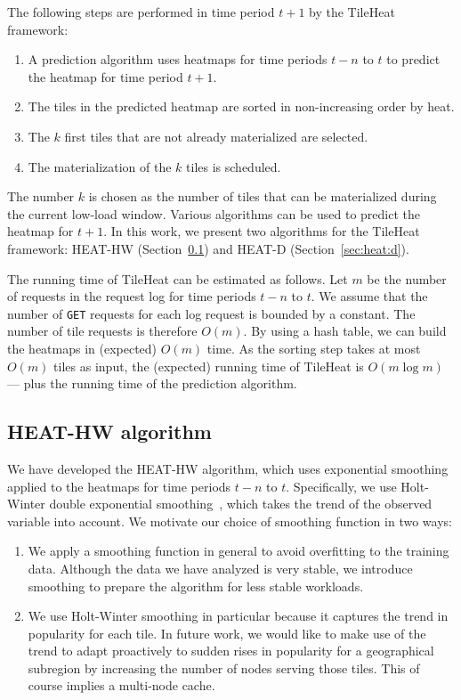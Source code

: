 \documentclass[11pt, oneside]{report}
\begin{document}
{The following steps are performed in time period $t+1$ by the TileHeat framework:
%
\begin{enumerate}
\item A prediction algorithm uses heatmaps for time periods $t-n$ to $t$ to predict the heatmap for time period $t+1$.
\item The tiles in the predicted heatmap are sorted in non-increasing order by heat.
\item The $k$ first tiles that are not already materialized are selected.
\item The materialization of the $k$ tiles is scheduled.
\end{enumerate}

The number $k$ is chosen as the number of tiles that can be materialized during the current low-load window. Various algorithms can be used to predict the heatmap for $t + 1$. In this work, we present two algorithms for the TileHeat framework: HEAT-HW (Section~\ref{sec:heat:hw}) and HEAT-D (Section~\ref{sec:heat:d}).

The running time of TileHeat can be estimated as follows. Let $m$ be the number of requests in the request log for time periods $t-n$ to $t$. We assume that the number of \texttt{GET} requests for each log request is bounded by a constant. The number of tile requests is therefore $O(m)$. By using a hash table, we can build the heatmaps in (expected) $O(m)$ time. As the sorting step takes at most $O(m)$ tiles as input, the (expected) running time of TileHeat is $O(m \log m)$ --- plus the running time of the prediction algorithm. 

\subsection{HEAT-HW algorithm}
\label{sec:heat:hw}
We have developed the HEAT-HW algorithm, which uses exponential smoothing applied to the heatmaps for time periods $t-n$ to $t$. Specifically, we use Holt-Winter double exponential smoothing~\cite{chatfield88}, which takes the trend of the observed variable into account. We motivate our choice of smoothing function in two ways:

\begin{enumerate}
\item We apply a smoothing function in general to avoid overfitting to the training data. Although the data we have analyzed is very stable, we introduce smoothing to prepare the algorithm for less stable workloads.
\item We use Holt-Winter smoothing in particular because it captures the trend in popularity for each tile. In future work, we would like to make use of the trend to adapt proactively to sudden rises in popularity for a geographical subregion by increasing the number of nodes serving those tiles. This of course implies a multi-node cache.
\end{enumerate}

}
\end{document}
